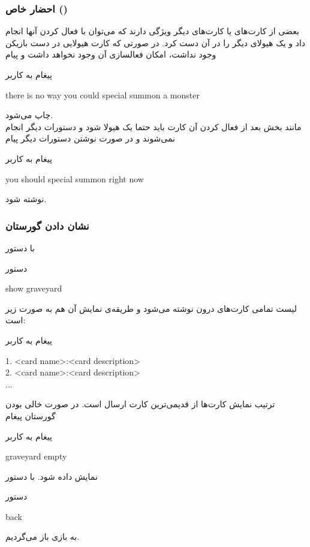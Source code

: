 \documentclass[]{article}
\begin{document}
\subsubsection*{{\titr احضار خاص ()}}
بعضی از کارت‌های  یا کارت‌های دیگر ویژگی دارند که می‌توان 
با فعال کردن آنها  انجام داد و یک هیولای دیگر را در آن 
دست 
 کرد. در صورتی که کارت هیولایی در دست بازیکن وجود نداشت، امکان 
فعالسازی آن  وجود نخواهد داشت و پیام 
\begin{mybox}[colback=yellow]{پیغام به کاربر}
	\begin{latin}	
		there is no way you could special summon a monster
	\end{latin}
\end{mybox}
چاپ می‌شود.
\\
مانند بخش  بعد از فعال کردن آن کارت باید حتما یک هیولا 
 شود و دستورات دیگر انجام نمی‌شوند و در صورت نوشتن دستورات دیگر 
پیام
\begin{mybox}[colback=yellow]{پیغام به کاربر}
	\begin{latin}	
		you should special summon right now
	\end{latin}
\end{mybox}
نوشته شود.

\subsubsection*{{\titr نشان دادن گورستان}}
با دستور 
\begin{mybox}[colback=yellow]{دستور}
	\begin{latin}	
		show graveyard
	\end{latin}
\end{mybox}
لیست تمامی کارت‌های درون  نوشته می‌شود و طریقه‌ی نمایش آن هم به 
صورت زیر است:
\begin{mybox}[colback=yellow]{پیغام به کاربر}
	\begin{latin}	
		1.  <card name>:<card description>\\
		2. <card name>:<card description>\\
		...
	\end{latin}
\end{mybox}
ترتیب نمایش کارت‌ها از قدیمی‌ترین کارت ارسال  است. در صورت خالی بودن گورستان 
پیغام
\begin{mybox}[colback=yellow]{پیغام به کاربر}
	\begin{latin}	
		graveyard empty
	\end{latin}
\end{mybox}
نمایش داده شود. با دستور
\begin{mybox}[colback=yellow]{دستور}
	\begin{latin}	
		back
	\end{latin}
\end{mybox}
به بازی باز می‌گردیم.
\end{document}
